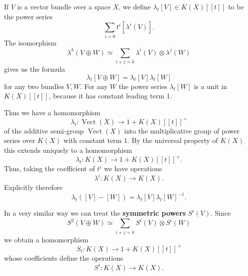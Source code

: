 \documentclass[leqno]{book}
\numberwithin{equation}{section}
\theoremstyle{definition}
\renewcommand{\emph}{\textbf}
\begin{document}
            If $V$ is a vector bundle over a space $X$, we define $\lambda_{t}[V]\in K(X)[[t]]$ to be the power series
            \begin{equation*}
              \sum_{i=0} t ^{i}[\lambda^{i}(V)].
            \end{equation*}
            The isomorphism
            \begin{equation*}
              \lambda^{k}(V\oplus W)\simeq \sum_{i+j=k}\lambda^{i}(V)\otimes \lambda^{j}(W)
            \end{equation*}
            gives us the formula
            \begin{equation*}
              \lambda_{t}[V\oplus W]=\lambda_{t}[V]\lambda_{t}[W]
            \end{equation*}
            for any two bundles $V,W$. For any $W$ the power series $\lambda_{t}[W]$ is a unit in $K(X)[[t]]$, because it has constant leading term 1.

            Thus we have a homomorphism
            \begin{equation*}
              \lambda_{t}:\operatorname{Vect}(X)\to 1+K(X)[[t]]^{+}
            \end{equation*}
            of the additive semi-group $\operatorname{Vect}(X)$ into the multiplicative group of power series over $K(X)$ with constant term $1$. By the universal property of $K(X)$ this extends uniquely to a homomorphism
            \begin{equation*}
              \lambda_{t}:K(X)\to 1+K(X)[[t]]^{+}.
            \end{equation*}
            Thus, taking the coefficient of $t ^{i}$ we have operations
            \begin{equation*}
              \lambda^{i}:K(X)\to K(X).
            \end{equation*}
            Explicitly therefore 
            \begin{equation*}
              \lambda_{t}([V]-[W])=\lambda_{t}[V]\lambda_{t}[W]^{-1}.
            \end{equation*}

            In a very similar way we can treat the \emph{symmetric powers} $S^{i}(V)$. Since
            \begin{equation*}
              S^{2}(V\oplus W)\simeq \sum_{i+j=k}S^{i}(V)\otimes S^{i}(W)
            \end{equation*}
            we obtain a homomorphism
            \begin{equation*}
              S_{t}:K(X)\to 1+K(X)[[t]]^{+}
            \end{equation*}
            whose coefficients define the operations
            \begin{equation*}
              S^{i}:K(X)\to K(X).
            \end{equation*}
\end{document}
